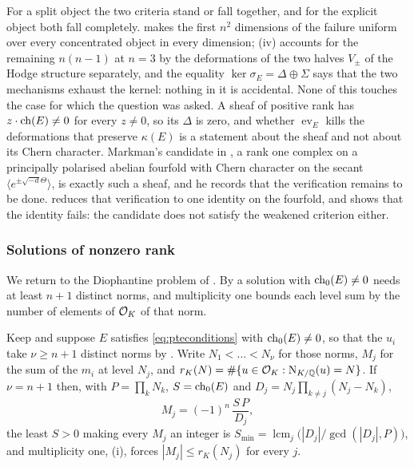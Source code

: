 \begin{remark}
\label{rem:question114}
For a split object the two criteria stand or fall together, and for the
explicit object both fall completely. \cite[Theorem~9.19]{paperI} makes the first
$n^{2}$ dimensions of the failure uniform over every concentrated object in
every dimension; (iv) accounts for the remaining
$n(n-1)$ at $n=3$ by the deformations of the two halves $V_{\pm}$ of the
Hodge structure separately, and the equality $\ker\sigma_{E}=\Delta\oplus\Sigma$
says that the two mechanisms exhaust the kernel: nothing in it is
accidental. None of this touches the case for which the question was asked.
A sheaf of positive rank has $z\cdot\operatorname{ch}(E)\ne0$ for every $z\ne0$, so its
$\Delta$ is zero, and whether $\operatorname{ev}_{E}$ kills the deformations
that preserve $\kappa(E)$ is a statement about the sheaf and not about its
Chern character. Markman's candidate in \cite[Section 12]{Mar25b}, a rank
one complex on a principally polarised abelian fourfold with Chern character
on the secant $\langle e^{\pm\sqrt{-d}\Theta}\rangle$, is exactly such a
sheaf, and he records that the verification remains to be done.
 reduces that verification to one identity on the fourfold,
and  shows that the identity fails: the candidate
does not satisfy the weakened criterion either.
\end{remark}

\subsubsection*{Solutions of nonzero rank}

We return to the Diophantine problem of . By
 a solution with $\operatorname{ch}_{0}(E)\ne0$ needs at least $n+1$
distinct norms, and multiplicity one bounds each level sum by the number of
elements of $\mathcal{O}_{K}$ of that norm.

\begin{proposition}\label{thm:pterange}
Keep  and suppose $E$ satisfies \eqref{eq:pteconditions} with
$\operatorname{ch}_{0}(E)\ne0$, so that the $u_{i}$ take $\nu\ge n+1$ distinct norms by
. Write $N_{1}<\dots<N_{\nu}$ for those norms, $M_{j}$ for
the sum of the $m_{i}$ at level $N_{j}$, and
$r_{K}(N)=\#\{u\in\mathcal{O}_{K}:\mathrm{N}_{K/\mathbb{Q}}(u)=N\}$. If $\nu=n+1$ then, with
$P=\prod_{k}N_{k}$, $S=\operatorname{ch}_{0}(E)$ and
$D_{j}=N_{j}\prod_{k\ne j}(N_{j}-N_{k})$,
\begin{equation}\label{eq:levelsums}
  M_{j}=(-1)^{n}\,\frac{S\,P}{D_{j}},
\end{equation}
the least $S>0$ making every $M_{j}$ an integer is
$S_{\min}=\operatorname{lcm}_{j}\bigl(|D_{j}|/\gcd(|D_{j}|,P)\bigr)$, and
multiplicity one, (i), forces
$|M_{j}|\le r_{K}(N_{j})$ for every $j$.
\end{proposition}

